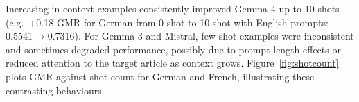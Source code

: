 \documentclass[
]{ceurart}
\theoremstyle{definition}
\begin{document}
\begin{table}[t]
\centering
\caption{Best development set results (global macro-recall); all-FALSE baseline $\approx$0.4167. Aya-Expanse was evaluated on the development set only; time constraints prevented test-set submission.}
\label{tab:dev}
\end{table}

Increasing in-context examples consistently improved Gemma-4 up to 10 shots (e.g.\ $+$0.18 GMR for German from 0-shot to 10-shot with English prompts: 0.5541$\to$0.7316).
For Gemma-3 and Mistral, few-shot examples were inconsistent and sometimes degraded performance, possibly due to prompt length effects or reduced attention to the target article as context grows.
Figure~\ref{fig:shotcount} plots GMR against shot count for German and French, illustrating these contrasting behaviours.
\end{document}

